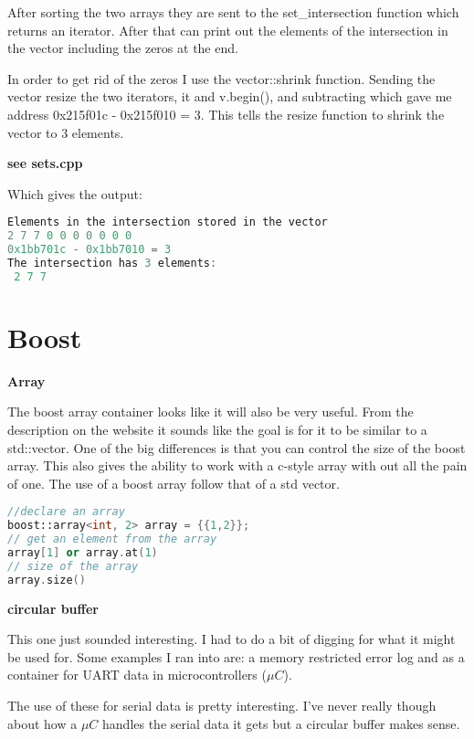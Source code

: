 \documentclass[a4paper,12pt]{article}
\begin{document}
After sorting the two arrays they are sent to the set\_intersection function which returns an iterator.  After that can print out the elements of the intersection in the vector including the zeros at the end.  

In order to get rid of the zeros I use the vector::shrink function. Sending the vector resize the two iterators, it and v.begin(), and subtracting which gave me address 0x215f01c - 0x215f010 = 3. This tells the resize function to shrink the vector to 3 elements. 

\textbf{see sets.cpp}
\newpage

Which gives the output: 

\begin{lstlisting}[language=cpp,caption={Output}]
Elements in the intersection stored in the vector
2 7 7 0 0 0 0 0 0 0 
0x1bb701c - 0x1bb7010 = 3
The intersection has 3 elements:
 2 7 7
\end{lstlisting}

\section{Boost}

\textbf{Array}

The boost array container looks like it will also be very useful.  From the description on the website it sounds like the goal is for it to be similar to a std::vector.  One of the big differences is that you can control the size of the boost array.  This also gives the ability to work with a c-style array with out all the pain of one.  The use of a boost array follow that of a std vector.  

\begin{lstlisting}[language=cpp,caption={boost array}]
//declare an array
boost::array<int, 2> array = {{1,2}};
// get an element from the array
array[1] or array.at(1)
// size of the array
array.size()
\end{lstlisting}

\textbf{circular buffer}

This one just sounded interesting.  I had to do a bit of digging for what it might be used for.  Some examples I ran into are: a memory restricted error log and as a container for UART data in microcontrollers ($\mu C$). 

The use of these for serial data is pretty interesting.  I've never really though about how a $\mu C$ handles the serial data it gets but a circular buffer makes sense. \\
\end{document}
